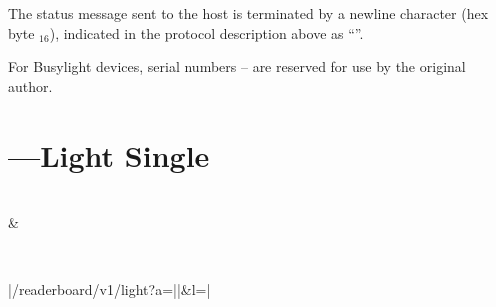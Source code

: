 The status message sent to the host is terminated by a newline character (hex byte $_{16}$),
indicated in the protocol description above as ``''.


For Busylight devices, serial numbers -- are reserved for use by the original author.

\section{---Light Single \led}
\begin{center}
\begin{bytefield}[endianness=little,bitwidth=0.11111\textwidth]{2}
	 \\
	 &
\end{bytefield}
\\
\begin{Coding}
	|/readerboard/v1/light?a=||&l=|
\end{Coding}
\end{center}


